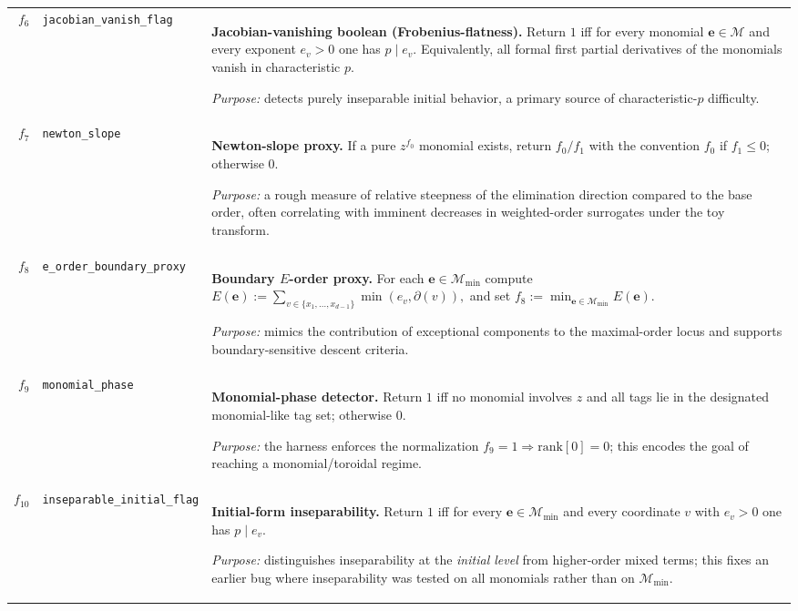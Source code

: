 \documentclass[11pt]{amsart}
\begin{document}
\begin{longtable}{@{}r p{} p{}@{}}
$f_6$ &
\texttt{jacobian\_vanish\_flag} &
\textbf{Jacobian-vanishing boolean (Frobenius-flatness).}
Return $1$ iff for every monomial $\mathbf{e}\in\mathcal M$ and every exponent $e_v>0$ one has $p\mid e_v$.
Equivalently, all formal first partial derivatives of the monomials vanish in characteristic $p$.

\emph{Purpose:} detects purely inseparable initial behavior, a primary source of characteristic-$p$ difficulty. \\[0.3em]

$f_7$ &
\texttt{newton\_slope} &
\textbf{Newton-slope proxy.}
If a pure $z^{f_0}$ monomial exists, return $f_0/f_1$ with the convention $f_0$ if $f_1\le 0$; otherwise $0$.

\emph{Purpose:} a rough measure of relative steepness of the elimination direction compared to the base order,
often correlating with imminent decreases in weighted-order surrogates under the toy transform. \\[0.3em]

$f_8$ &
\texttt{e\_order\_boundary\_proxy} &
\textbf{Boundary $E$-order proxy.}
For each $\mathbf{e}\in\mathcal M_{\min}$ compute
$
E(\mathbf{e}):=\sum_{v\in\{x_1,\dots,x_{d-1}\}}\min(e_v,\partial(v)),
$
and set $f_8:=\min_{\mathbf{e}\in\mathcal M_{\min}} E(\mathbf{e})$.

\emph{Purpose:} mimics the contribution of exceptional components to the maximal-order locus and supports
boundary-sensitive descent criteria. \\[0.3em]

$f_9$ &
\texttt{monomial\_phase} &
\textbf{Monomial-phase detector.}
Return $1$ iff no monomial involves $z$ and all tags lie in the designated monomial-like tag set; otherwise $0$.

\emph{Purpose:} the harness enforces the normalization $f_9=1\Rightarrow \mathrm{rank}[0]=0$; this encodes the goal
of reaching a monomial/toroidal regime. \\[0.3em]

$f_{10}$ &
\texttt{inseparable\_initial\_flag} &
\textbf{Initial-form inseparability.}
Return $1$ iff for every $\mathbf{e}\in\mathcal M_{\min}$ and every coordinate $v$ with $e_v>0$ one has $p\mid e_v$.

\emph{Purpose:} distinguishes inseparability at the \emph{initial level} from higher-order mixed terms; this fixes an
earlier bug where inseparability was tested on all monomials rather than on $\mathcal M_{\min}$. \\[0.3em]


\end{longtable}
\end{document}
